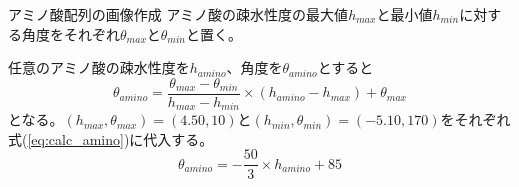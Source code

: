 \documentclass[dvipdfmx]{beamer}
\begin{document}
  \begin{frame}{アミノ酸配列の画像作成}
    アミノ酸の疎水性度の最大値\(h_{max}\)と最小値\(h_{min}\)に対する角度をそれぞれ\(\theta_{max}\)と\(\theta_{min}\)と置く。
    \begin{figure}[H]
      \centering
    \end{figure}
  \end{frame}

  \begin{frame}
    任意のアミノ酸の疎水性度を\(h_{amino}\)、角度を\(\theta_{amino}\)とすると
    \begin{equation}
      \label{eq:calc_amino}
      \theta_{amino} = \frac{\theta_{max} - \theta_{min}}{h_{max} - h_{min}} \times (h_{amino} - h_{max}) + \theta_{max}
    \end{equation}
    となる。\((h_{max}, \theta_{max}) = (4.50, 10)\)と\((h_{min}, \theta_{min}) = (-5.10, 170)\)をそれぞれ式(\ref{eq:calc_amino})に代入する。
    \begin{equation}
      \label{eq:calc_amino_concreate}
      \theta_{amino} = - \frac{50}{3} \times h_{amino} + 85
    \end{equation}
  \end{frame}
\end{document}
